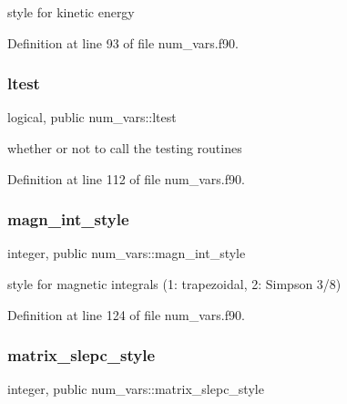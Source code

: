 style for kinetic energy 



Definition at line 93 of file num\+\_\+vars.\+f90.

\mbox{\label{namespacenum__vars_a06597cae984d53aec80c150fc13d3e7f}} 
\subsubsection{\texorpdfstring{ltest}{ltest}}
{\footnotesize\ttfamily logical, public num\+\_\+vars\+::ltest}



whether or not to call the testing routines 



Definition at line 112 of file num\+\_\+vars.\+f90.

\mbox{\label{namespacenum__vars_af0177cf335f43b5d27d9a016770c8f7a}} 
\subsubsection{\texorpdfstring{magn\+\_\+int\+\_\+style}{magn\_int\_style}}
{\footnotesize\ttfamily integer, public num\+\_\+vars\+::magn\+\_\+int\+\_\+style}



style for magnetic integrals (1\+: trapezoidal, 2\+: Simpson 3/8) 



Definition at line 124 of file num\+\_\+vars.\+f90.

\mbox{\label{namespacenum__vars_addd869f9551067812954f8e24fe078b1}} 
\subsubsection{\texorpdfstring{matrix\+\_\+slepc\+\_\+style}{matrix\_slepc\_style}}
{\footnotesize\ttfamily integer, public num\+\_\+vars\+::matrix\+\_\+slepc\+\_\+style}



